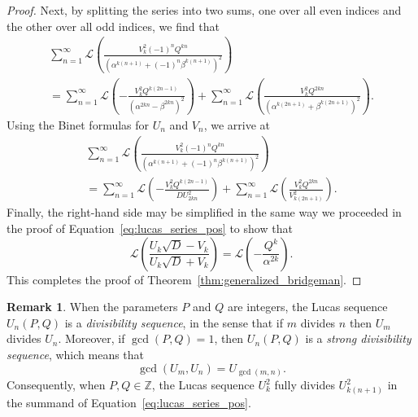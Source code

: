 \documentclass[10pt]{article}
\theoremstyle{definition}
\newtheorem{remark}{Remark}
\begin{document}
\begin{proof}
    Next, by splitting the series into two sums, one over all even indices and the other over all odd indices, we find that
    \begin{multline*}
        \sum_{n=1}^{\infty}\mathcal{L}\left(\frac{V^2_k (-1)^n Q^{kn}}{\left(\alpha^{k(n+1)}+(-1)^{n}\beta^{k(n+1)}\right)^2 }\right) \\ = \sum_{n=1}^{\infty}\mathcal{L}\left(-\frac{V^2_k Q^{k(2n-1)}}{\left(\alpha^{2kn}-\beta^{2kn}\right)^2 }\right) + \sum_{n=1}^{\infty}\mathcal{L}\left(\frac{V^2_k Q^{2kn}}{\left(\alpha^{k(2n+1)}+\beta^{k(2n+1)}\right)^2 }\right).
    \end{multline*}
    Using the Binet formulas for $U_n$ and $V_n$, we arrive at
        \begin{multline*}
        \sum_{n=1}^{\infty}\mathcal{L}\left(\frac{V^2_k (-1)^n Q^{kn}}{\left(\alpha^{k(n+1)}+(-1)^{n}\beta^{k(n+1)}\right)^2 }\right) \\ = \sum_{n=1}^{\infty}\mathcal{L}\left(-\frac{V^2_k Q^{k(2n-1)}}{D U^2_{2kn} }\right) + \sum_{n=1}^{\infty}\mathcal{L}\left(\frac{V^2_k Q^{2kn}}{ V^2_{k(2n+1)}}\right).
    \end{multline*}
    Finally, the right-hand side may be simplified in the same way we proceeded in the proof of Equation~\eqref{eq:lucas_series_pos} to show that
    \begin{equation*}
        \mathcal{L}\left(\frac{U_k\sqrt{D}-V_k}{U_k\sqrt{D}+V_k}\right) = \mathcal{L}\left(-\frac{Q^k}{\alpha^{2k}}\right).
    \end{equation*}
    This completes the proof of Theorem~\ref{thm:generalized_bridgeman}.
\end{proof}
\begin{remark}
    When the parameters $P$ and $Q$ are integers, the Lucas sequence $U_n(P,Q)$ is a \textit{divisibility sequence}, in the sense that if $m$ divides $n$ then $U_m$ divides $U_n$.  Moreover, if $\gcd(P,Q) = 1$, then $U_n(P,Q)$ is a \textit{strong divisibility sequence}, which means that
    \begin{equation*}
        \gcd(U_m,U_n) = U_{\gcd(m,n)}.
    \end{equation*}
    Consequently, when $P,Q \in \mathbb{Z}$, the Lucas sequence $U^2_k$ fully divides $U^2_{k(n+1)}$ in the summand of Equation~\eqref{eq:lucas_series_pos}.
\end{remark}
\end{document}
